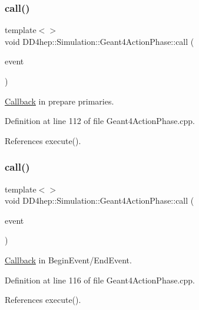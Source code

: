 \subsubsection{\texorpdfstring{call()}{call()}\hspace{0.1cm}{\footnotesize\ttfamily [2/12]}}
{\footnotesize\ttfamily template$<$$>$ \\
void D\+D4hep\+::\+Simulation\+::\+Geant4\+Action\+Phase\+::call (\begin{DoxyParamCaption}\item[{G4\+Event $\ast$}]{event }\end{DoxyParamCaption})}



\hyperlink{class_d_d4hep_1_1_callback}{Callback} in prepare primaries. 



Definition at line 112 of file Geant4\+Action\+Phase.\+cpp.



References execute().

\hypertarget{class_d_d4hep_1_1_simulation_1_1_geant4_action_phase_aa123cb33310cc19103e4d45104da93c5}{}\label{class_d_d4hep_1_1_simulation_1_1_geant4_action_phase_aa123cb33310cc19103e4d45104da93c5} 
\subsubsection{\texorpdfstring{call()}{call()}\hspace{0.1cm}{\footnotesize\ttfamily [3/12]}}
{\footnotesize\ttfamily template$<$$>$ \\
void D\+D4hep\+::\+Simulation\+::\+Geant4\+Action\+Phase\+::call (\begin{DoxyParamCaption}\item[{const G4\+Event $\ast$}]{event }\end{DoxyParamCaption})}



\hyperlink{class_d_d4hep_1_1_callback}{Callback} in Begin\+Event/\+End\+Event. 



Definition at line 116 of file Geant4\+Action\+Phase.\+cpp.



References execute().

